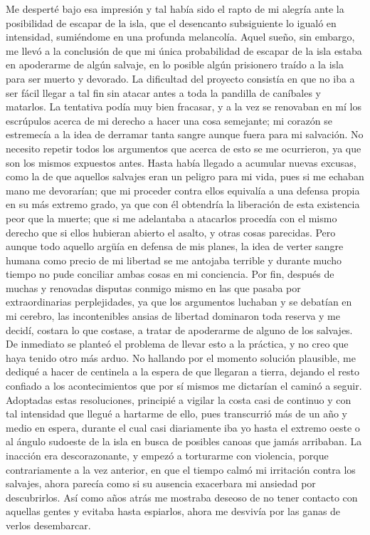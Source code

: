 \documentclass{novela}
\begin{document}
    Me desperté bajo esa impresión y tal había sido el rapto de mi alegría ante la posibilidad de escapar de la isla, que el desencanto subsiguiente lo igualó en intensidad, sumiéndome en una profunda melancolía.
    Aquel sueño, sin embargo, me llevó a la conclusión de que mi única probabilidad de escapar de la isla estaba en apoderarme de algún salvaje, en lo posible algún prisionero traído a la isla para ser muerto y devorado. La dificultad del proyecto consistía en que no iba a ser fácil llegar a tal fin sin atacar antes a toda la pandilla de caníbales y matarlos. La tentativa podía muy bien fracasar, y a la vez se renovaban en mí los escrúpulos acerca de mi derecho a hacer una cosa semejante; mi corazón se estremecía a la idea de derramar tanta sangre aunque fuera para mi salvación. No necesito repetir todos los argumentos que acerca de esto se me ocurrieron, ya que son los mismos expuestos antes. Hasta había llegado a acumular nuevas excusas, como la de que aquellos salvajes eran un peligro para mi vida, pues si me echaban mano me devorarían; que mi proceder contra ellos equivalía a una defensa propia en su más extremo grado, ya que con él obtendría la liberación de esta existencia peor que la muerte; que si me adelantaba a atacarlos procedía con el mismo derecho que si ellos hubieran abierto el asalto, y otras cosas parecidas. Pero aunque todo aquello argüía en defensa de mis planes, la idea de verter sangre humana como precio de mi libertad se me antojaba terrible y durante mucho tiempo no pude conciliar ambas cosas en mi conciencia.
    Por fin, después de muchas y renovadas disputas conmigo mismo en las que pasaba por extraordinarias perplejidades, ya que los argumentos luchaban y se debatían en mi cerebro, las incontenibles ansias de libertad dominaron toda reserva y me decidí, costara lo que costase, a tratar de apoderarme de alguno de los salvajes.
    De inmediato se planteó el problema de llevar esto a la práctica, y no creo que haya tenido otro más arduo. No hallando por el momento solución plausible, me dediqué a hacer de centinela a la espera de que llegaran a tierra, dejando el resto confiado a los acontecimientos que por sí mismos me dictarían el caminó a seguir.
    Adoptadas estas resoluciones, principié a vigilar la costa casi de continuo y con tal intensidad que llegué a hartarme de ello, pues transcurrió más de un año y medio en espera, durante el cual casi diariamente iba yo hasta el extremo oeste o al ángulo sudoeste de la isla en busca de posibles canoas que jamás arribaban. La inacción era descorazonante, y empezó a torturarme con violencia, porque contrariamente a la vez anterior, en que el tiempo calmó mi irritación contra los salvajes, ahora parecía como si su ausencia exacerbara mi ansiedad por descubrirlos. Así como años atrás me mostraba deseoso de no tener contacto con aquellas gentes y evitaba hasta espiarlos, ahora me desvivía por las ganas de verlos desembarcar.
\end{document}
